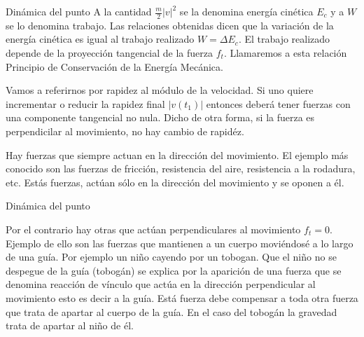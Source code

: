 \documentclass[handout,hyperref={colorlinks=true}]{beamer}
\newcommand{\nl}{\onslide<+-> }
\begin{document}
\begin{frame}{Dinámica del punto}
\nl  A la cantidad $\frac{m}{2}|v|^2$ se la denomina energía cinética $E_c$ y a $W$ se lo denomina trabajo. 
Las relaciones obtenidas dicen que la variación de la energía cinética es igual al trabajo realizado $W=\Delta E_c$. 
El trabajo realizado depende de la proyección tangencial de la fuerza $f_t$.  Llamaremos a esta relación
Principio de Conservación de la Energía Mecánica.

\nl  Vamos a referirnos por rapidez al módulo de la velocidad. 
Si uno quiere incrementar o reducir la rapidez final $|v(t_1)|$ entonces deberá tener fuerzas con una componente tangencial no nula. 
Dicho de otra forma, si la fuerza es perpendicilar al movimiento, no hay cambio de rapidéz. 

\nl  Hay fuerzas que siempre actuan en la dirección del movimiento. El ejemplo más conocido son las fuerzas de fricción, resistencia del aire,
resistencia a la rodadura, etc. Estás fuerzas, actúan sólo en la dirección del movimiento y se oponen a él.

\end{frame}

\begin{frame}{Dinámica del punto}
 

\nl  Por el contrario hay otras que actúan perpendiculares al movimiento $f_t=0$. Ejemplo de ello son las fuerzas que mantienen a un cuerpo moviéndosé a lo largo 
de una guía. Por ejemplo un niño cayendo por un tobogan. Que el niño no se despegue de la guía (tobogán) se explica por la aparición de una fuerza que se denomina
reacción de vínculo que actúa en la dirección perpendicular al movimiento esto es decir a la guía. Está fuerza debe compensar a toda otra fuerza que trata de apartar
al cuerpo de la guía.  En el caso del tobogán la gravedad trata de apartar al niño de él.


\end{frame}
\end{document}
